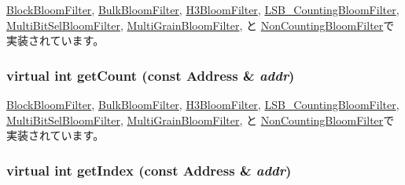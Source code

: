 \hyperlink{classBlockBloomFilter_addb6b805abb8328082a24926f2bf8c84}{BlockBloomFilter}, \hyperlink{classBulkBloomFilter_addb6b805abb8328082a24926f2bf8c84}{BulkBloomFilter}, \hyperlink{classH3BloomFilter_addb6b805abb8328082a24926f2bf8c84}{H3BloomFilter}, \hyperlink{classLSB__CountingBloomFilter_addb6b805abb8328082a24926f2bf8c84}{LSB\_\-CountingBloomFilter}, \hyperlink{classMultiBitSelBloomFilter_addb6b805abb8328082a24926f2bf8c84}{MultiBitSelBloomFilter}, \hyperlink{classMultiGrainBloomFilter_addb6b805abb8328082a24926f2bf8c84}{MultiGrainBloomFilter}, と \hyperlink{classNonCountingBloomFilter_addb6b805abb8328082a24926f2bf8c84}{NonCountingBloomFilter}で実装されています。\hypertarget{classAbstractBloomFilter_ab6253919ea6ff1b2c17506742b34147d}{
\subsubsection[{getCount}]{\setlength{\rightskip}{0pt plus 5cm}virtual int getCount (const {\bf Address} \& {\em addr})}}
\label{classAbstractBloomFilter_ab6253919ea6ff1b2c17506742b34147d}


\hyperlink{classBlockBloomFilter_abb722634d5846105b673e9496df8d062}{BlockBloomFilter}, \hyperlink{classBulkBloomFilter_abb722634d5846105b673e9496df8d062}{BulkBloomFilter}, \hyperlink{classH3BloomFilter_abb722634d5846105b673e9496df8d062}{H3BloomFilter}, \hyperlink{classLSB__CountingBloomFilter_abb722634d5846105b673e9496df8d062}{LSB\_\-CountingBloomFilter}, \hyperlink{classMultiBitSelBloomFilter_abb722634d5846105b673e9496df8d062}{MultiBitSelBloomFilter}, \hyperlink{classMultiGrainBloomFilter_abb722634d5846105b673e9496df8d062}{MultiGrainBloomFilter}, と \hyperlink{classNonCountingBloomFilter_abb722634d5846105b673e9496df8d062}{NonCountingBloomFilter}で実装されています。\hypertarget{classAbstractBloomFilter_a4dd174ae24a8237d41cf0b02c78b896d}{
\subsubsection[{getIndex}]{\setlength{\rightskip}{0pt plus 5cm}virtual int getIndex (const {\bf Address} \& {\em addr})}}
\label{classAbstractBloomFilter_a4dd174ae24a8237d41cf0b02c78b896d}


